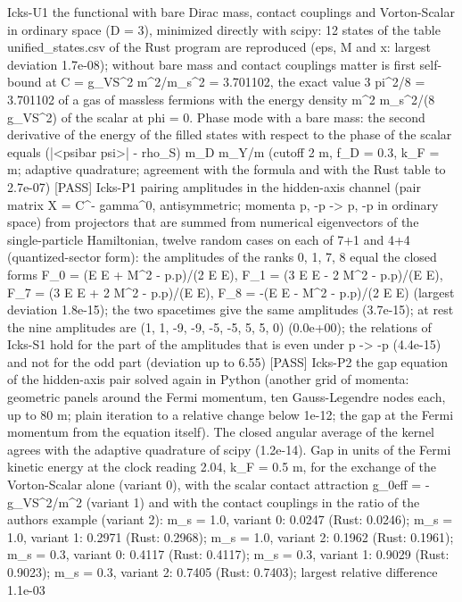 \documentclass[
  10pt,
]{article}
\newenvironment{Shaded}{}{}
\newcommand{\NormalTok}[1]{#1}
\begin{document}
\begin{Shaded}
\begin{Highlighting}[]
\NormalTok{[PASS] Icks{-}U1  the functional with bare Dirac mass, contact couplings and Vorton{-}Scalar in ordinary space (D = 3), minimized directly with scipy: 12 states of the table unified\_states.csv of the Rust program are reproduced (eps, M and x: largest deviation 1.7e{-}08); without bare mass and contact couplings matter is first self{-}bound at C = g\_VS\^{}2 m\^{}2/m\_s\^{}2 = 3.701102, the exact value 3 pi\^{}2/8 = 3.701102 of a gas of massless fermions with the energy density m\^{}2 m\_s\^{}2/(8 g\_VS\^{}2) of the scalar at phi = 0. Phase mode with a bare mass: the second derivative of the energy of the filled states with respect to the phase of the scalar equals (|\textless{}psibar psi\textgreater{}| {-} rho\_S) m\_D m\_Y/m (cutoff 2 m, f\_D = 0.3, k\_F = m; adaptive quadrature; agreement with the formula and with the Rust table to 2.7e{-}07)}
\NormalTok{[PASS] Icks{-}P1  pairing amplitudes in the hidden{-}axis channel (pair matrix X = C\^{}{-} gamma\^{}0, antisymmetric; momenta p, {-}p {-}\textgreater{} p\textquotesingle{}, {-}p\textquotesingle{} in ordinary space) from projectors that are summed from numerical eigenvectors of the single{-}particle Hamiltonian, twelve random cases on each of 7+1 and 4+4 (quantized{-}sector form): the amplitudes of the ranks 0, 1, 7, 8 equal the closed forms F\_0 = (E E\textquotesingle{} + M\^{}2 {-} p.p\textquotesingle{})/(2 E E\textquotesingle{}), F\_1 = (3 E E\textquotesingle{} {-} 2 M\^{}2 {-} p.p\textquotesingle{})/(E E\textquotesingle{}), F\_7 = (3 E E\textquotesingle{} + 2 M\^{}2 {-} p.p\textquotesingle{})/(E E\textquotesingle{}), F\_8 = {-}(E E\textquotesingle{} {-} M\^{}2 {-} p.p\textquotesingle{})/(2 E E\textquotesingle{}) (largest deviation 1.8e{-}15); the two spacetimes give the same amplitudes (3.7e{-}15); at rest the nine amplitudes are (1, 1, {-}9, {-}9, {-}5, {-}5, 5, 5, 0) (0.0e+00); the relations of Icks{-}S1 hold for the part of the amplitudes that is even under p\textquotesingle{} {-}\textgreater{} {-}p\textquotesingle{} (4.4e{-}15) and not for the odd part (deviation up to 6.55)}
\NormalTok{[PASS] Icks{-}P2  the gap equation of the hidden{-}axis pair solved again in Python (another grid of momenta: geometric panels around the Fermi momentum, ten Gauss{-}Legendre nodes each, up to 80 m; plain iteration to a relative change below 1e{-}12; the gap at the Fermi momentum from the equation itself). The closed angular average of the kernel agrees with the adaptive quadrature of scipy (1.2e{-}14). Gap in units of the Fermi kinetic energy at the clock reading 2.04, k\_F = 0.5 m, for the exchange of the Vorton{-}Scalar alone (variant 0), with the scalar contact attraction g\_0eff = {-}g\_VS\^{}2/m\^{}2 (variant 1) and with the contact couplings in the ratio of the author\textquotesingle{}s example (variant 2): m\_s = 1.0, variant 0: 0.0247 (Rust: 0.0246); m\_s = 1.0, variant 1: 0.2971 (Rust: 0.2968); m\_s = 1.0, variant 2: 0.1962 (Rust: 0.1961); m\_s = 0.3, variant 0: 0.4117 (Rust: 0.4117); m\_s = 0.3, variant 1: 0.9029 (Rust: 0.9023); m\_s = 0.3, variant 2: 0.7405 (Rust: 0.7403); largest relative difference 1.1e{-}03}

\end{Highlighting}
\end{Shaded}
\end{document}
